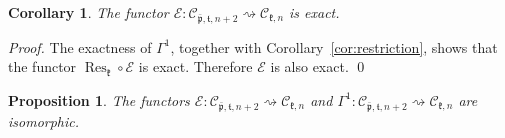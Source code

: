 \documentclass{tglat2e}
\newtheorem{prop}[theorem]{Proposition}
\newtheorem{corollary}[theorem]{Corollary}
\theoremstyle{definition}
\theoremstyle{remark}
\renewcommand{\tt}{\mathfrak{t}}
\newcommand{\kk}{\mathfrak{k}}
\newcommand{\pp}{\mathfrak{p}}
\DeclareMathOperator{\Res}{Res}
\begin{document}
\begin{corollary}\label{cor:fexact} The functor $\mathcal E:\mathcal{C}_{\bar{\pp},\tt,n+2}\rightsquigarrow\mathcal{C}_{\kk,n}$ is exact.
\end{corollary}

\begin{proof}
	The exactness of $\Gamma^1$, together with
        Corollary~\ref{cor:restriction}, shows that the functor
        $\Res_\kk\circ\mathcal{E}$ is exact.  Therefore $\mathcal{E}$
        is also exact.
\qed\end{proof}

\begin{prop}\label{prop:isomf} The functors $\mathcal E:\mathcal{C}_{\bar{\pp},\tt,n+2}\rightsquigarrow\mathcal{C}_{\kk,n}$ and
$\Gamma^1:\mathcal{C}_{\bar{\pp},\tt,n+2}\rightsquigarrow\mathcal{C}_{\kk,n}$ are isomorphic.
\end{prop}
\end{document}
